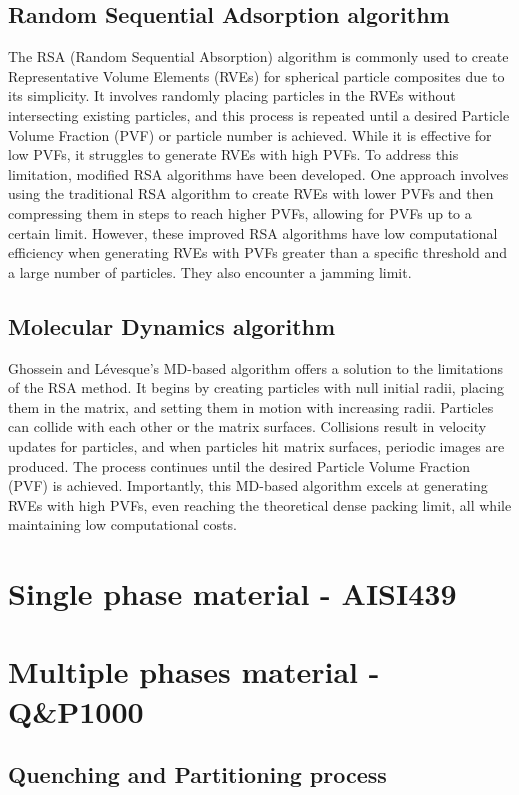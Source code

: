 \subsection{Random Sequential Adsorption algorithm}
The RSA (Random Sequential Absorption) algorithm is commonly used to create Representative Volume Elements (RVEs) for spherical particle composites due to its simplicity. It involves randomly placing particles in the RVEs without intersecting existing particles, and this process is repeated until a desired Particle Volume Fraction (PVF) or particle number is achieved. While it is effective for low PVFs, it struggles to generate RVEs with high PVFs. To address this limitation, modified RSA algorithms have been developed. One approach involves using the traditional RSA algorithm to create RVEs with lower PVFs and then compressing them in steps to reach higher PVFs, allowing for PVFs up to a certain limit. However, these improved RSA algorithms have low computational efficiency when generating RVEs with PVFs greater than a specific threshold and a large number of particles. They also encounter a jamming limit.

\subsection{Molecular Dynamics algorithm}
Ghossein and Lévesque's MD-based algorithm offers a solution to the limitations of the RSA method. It begins by creating particles with null initial radii, placing them in the matrix, and setting them in motion with increasing radii. Particles can collide with each other or the matrix surfaces. Collisions result in velocity updates for particles, and when particles hit matrix surfaces, periodic images are produced. The process continues until the desired Particle Volume Fraction (PVF) is achieved. Importantly, this MD-based algorithm excels at generating RVEs with high PVFs, even reaching the theoretical dense packing limit, all while maintaining low computational costs.

\section{Single phase material - AISI439}

\section{Multiple phases material - Q\&P1000}

\subsection{Quenching and Partitioning process}


